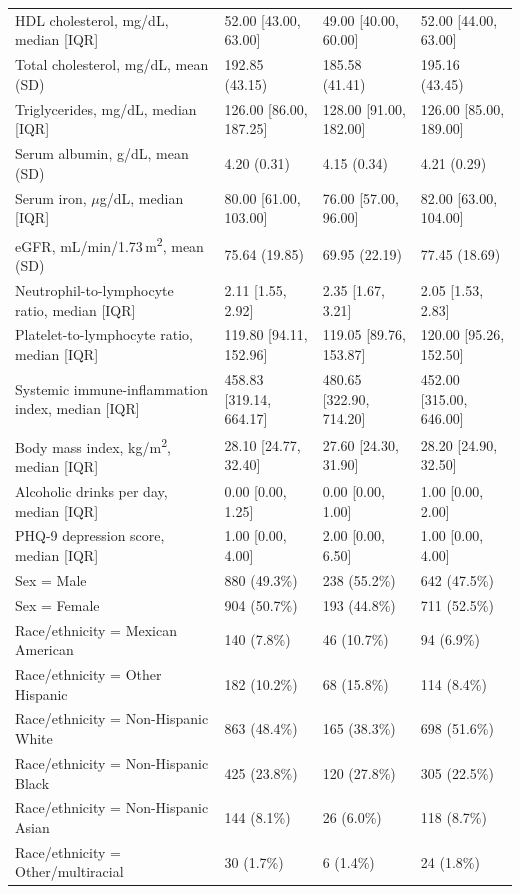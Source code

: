 \documentclass[12pt]{article}
\begin{document}
\begin{longtable}{p{6.6cm}R{2.6cm}R{2.6cm}R{2.6cm}}
HDL cholesterol, mg/dL, median [IQR] & 52.00 [43.00, 63.00] & 49.00 [40.00, 60.00] & 52.00 [44.00, 63.00] \\
Total cholesterol, mg/dL, mean (SD) & 192.85 (43.15) & 185.58 (41.41) & 195.16 (43.45) \\
Triglycerides, mg/dL, median [IQR] & 126.00 [86.00, 187.25] & 128.00 [91.00, 182.00] & 126.00 [85.00, 189.00] \\
Serum albumin, g/dL, mean (SD) & 4.20 (0.31) & 4.15 (0.34) & 4.21 (0.29) \\
Serum iron, $\mu$g/dL, median [IQR] & 80.00 [61.00, 103.00] & 76.00 [57.00, 96.00] & 82.00 [63.00, 104.00] \\
eGFR, mL/min/1.73\,m\textsuperscript{2}, mean (SD) & 75.64 (19.85) & 69.95 (22.19) & 77.45 (18.69) \\
Neutrophil-to-lymphocyte ratio, median [IQR] & 2.11 [1.55, 2.92] & 2.35 [1.67, 3.21] & 2.05 [1.53, 2.83] \\
Platelet-to-lymphocyte ratio, median [IQR] & 119.80 [94.11, 152.96] & 119.05 [89.76, 153.87] & 120.00 [95.26, 152.50] \\
Systemic immune-inflammation index, median [IQR] & 458.83 [319.14, 664.17] & 480.65 [322.90, 714.20] & 452.00 [315.00, 646.00] \\
Body mass index, kg/m\textsuperscript{2}, median [IQR] & 28.10 [24.77, 32.40] & 27.60 [24.30, 31.90] & 28.20 [24.90, 32.50] \\
Alcoholic drinks per day, median [IQR] & 0.00 [0.00, 1.25] & 0.00 [0.00, 1.00] & 1.00 [0.00, 2.00] \\
PHQ-9 depression score, median [IQR] & 1.00 [0.00, 4.00] & 2.00 [0.00, 6.50] & 1.00 [0.00, 4.00] \\
Sex = Male & 880 (49.3\%) & 238 (55.2\%) & 642 (47.5\%) \\
Sex = Female & 904 (50.7\%) & 193 (44.8\%) & 711 (52.5\%) \\
Race/ethnicity = Mexican American & 140 (7.8\%) & 46 (10.7\%) & 94 (6.9\%) \\
Race/ethnicity = Other Hispanic & 182 (10.2\%) & 68 (15.8\%) & 114 (8.4\%) \\
Race/ethnicity = Non-Hispanic White & 863 (48.4\%) & 165 (38.3\%) & 698 (51.6\%) \\
Race/ethnicity = Non-Hispanic Black & 425 (23.8\%) & 120 (27.8\%) & 305 (22.5\%) \\
Race/ethnicity = Non-Hispanic Asian & 144 (8.1\%) & 26 (6.0\%) & 118 (8.7\%) \\
Race/ethnicity = Other/multiracial & 30 (1.7\%) & 6 (1.4\%) & 24 (1.8\%) \\

\end{longtable}
\end{document}
